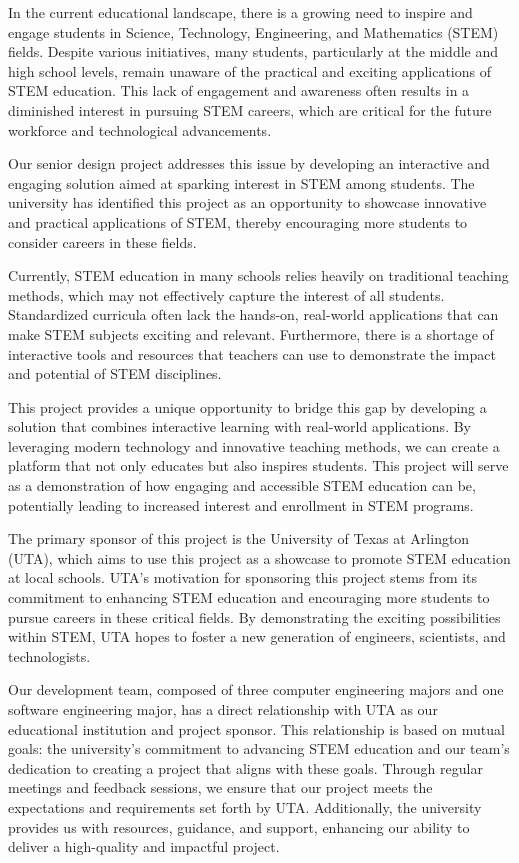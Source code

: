 In the current educational landscape, there is a growing need to inspire and engage students in Science, Technology, Engineering, and Mathematics (STEM) fields. Despite various initiatives, many students, particularly at the middle and high school levels, remain unaware of the practical and exciting applications of STEM education. This lack of engagement and awareness often results in a diminished interest in pursuing STEM careers, which are critical for the future workforce and technological advancements.

Our senior design project addresses this issue by developing an interactive and engaging solution aimed at sparking interest in STEM among students. The university has identified this project as an opportunity to showcase innovative and practical applications of STEM, thereby encouraging more students to consider careers in these fields.

Currently, STEM education in many schools relies heavily on traditional teaching methods, which may not effectively capture the interest of all students. Standardized curricula often lack the hands-on, real-world applications that can make STEM subjects exciting and relevant. Furthermore, there is a shortage of interactive tools and resources that teachers can use to demonstrate the impact and potential of STEM disciplines.

This project provides a unique opportunity to bridge this gap by developing a solution that combines interactive learning with real-world applications. By leveraging modern technology and innovative teaching methods, we can create a platform that not only educates but also inspires students. This project will serve as a demonstration of how engaging and accessible STEM education can be, potentially leading to increased interest and enrollment in STEM programs.

The primary sponsor of this project is the University of Texas at Arlington (UTA), which aims to use this project as a showcase to promote STEM education at local schools. UTA’s motivation for sponsoring this project stems from its commitment to enhancing STEM education and encouraging more students to pursue careers in these critical fields. By demonstrating the exciting possibilities within STEM, UTA hopes to foster a new generation of engineers, scientists, and technologists.

Our development team, composed of three computer engineering majors and one software engineering major, has a direct relationship with UTA as our educational institution and project sponsor. This relationship is based on mutual goals: the university's commitment to advancing STEM education and our team’s dedication to creating a project that aligns with these goals. Through regular meetings and feedback sessions, we ensure that our project meets the expectations and requirements set forth by UTA. Additionally, the university provides us with resources, guidance, and support, enhancing our ability to deliver a high-quality and impactful project.

